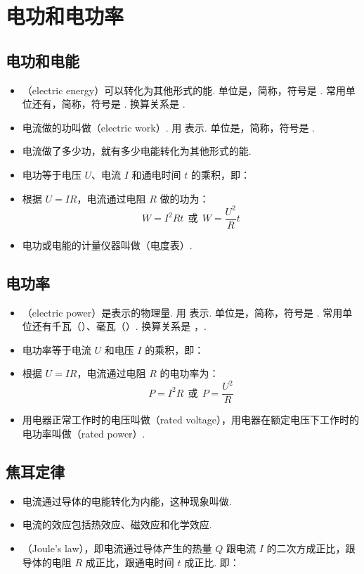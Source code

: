 \section{电功和电功率}

\subsection{电功和电能}
\begin{itemize}
\item {}（electric energy）可以转化为其他形式的能. 单位是，简称，符号是 . 常用单位还有，简称，符号是 . 换算关系是 .
\item 电流做的功叫做（electric work）. 用  表示. 单位是，简称，符号是 .
\item 电流做了多少功，就有多少电能转化为其他形式的能.
\item 电功等于电压 $U$、电流 $I$ 和通电时间 $t$ 的乘积，即：
\item 根据 $U=IR$，电流通过电阻 $R$ 做的功为：
$$
W=I^2Rt~~或~~W=\frac{U^2}Rt
$$
\item 电功或电能的计量仪器叫做（电度表）.
\end{itemize}

\subsection{电功率}
\begin{itemize}
\item {}（electric power）是表示的物理量. 用  表示. 单位是，简称，符号是 . 常用单位还有千瓦（）、毫瓦（）. 换算关系是 ，.
\item 电功率等于电流 $U$ 和电压 $I$ 的乘积，即：
\item 根据 $U=IR$，电流通过电阻 $R$ 的电功率为：
$$
P=I^2R~~或~~P=\frac{U^2}R
$$
\item 用电器正常工作时的电压叫做（rated voltage），用电器在额定电压下工作时的电功率叫做（rated power）.
\end{itemize}

\subsection{焦耳定律}
\begin{itemize}
\item 电流通过导体的电能转化为内能，这种现象叫做.
\item 电流的效应包括热效应、磁效应和化学效应.
\item {}（Joule's law），即电流通过导体产生的热量 $Q$ 跟电流 $I$ 的二次方成正比，跟导体的电阻 $R$ 成正比，跟通电时间 $t$ 成正比. 即：
\end{itemize}